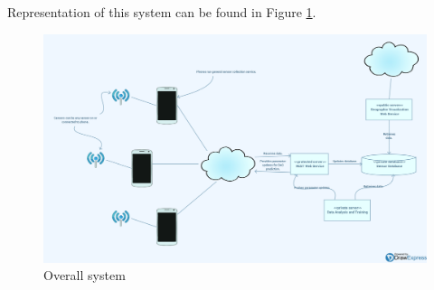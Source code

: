 Representation of this system can be found in Figure \ref{overallsystem}.

\begin{figure}[H]
	\centering
	\includegraphics[scale=.14]{../figs/overall_system.png}
	\caption{Overall system}
	\label{overallsystem}
\end{figure}
